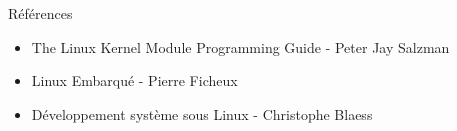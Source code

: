 \documentclass[12pt, t]{beamer}
\newcommand{\bi}{\begin{itemize}}
\newcommand{\ei}{\end{itemize}}
\begin{document}
\begin{frame}{Références}
    \vspace{30pt}

    \bi
    \itemsep12pt
    \item The Linux Kernel Module Programming Guide - Peter Jay Salzman
    \item Linux Embarqué - Pierre Ficheux
    \item Développement système sous Linux - Christophe Blaess
    \ei
\end{frame}
\end{document}
